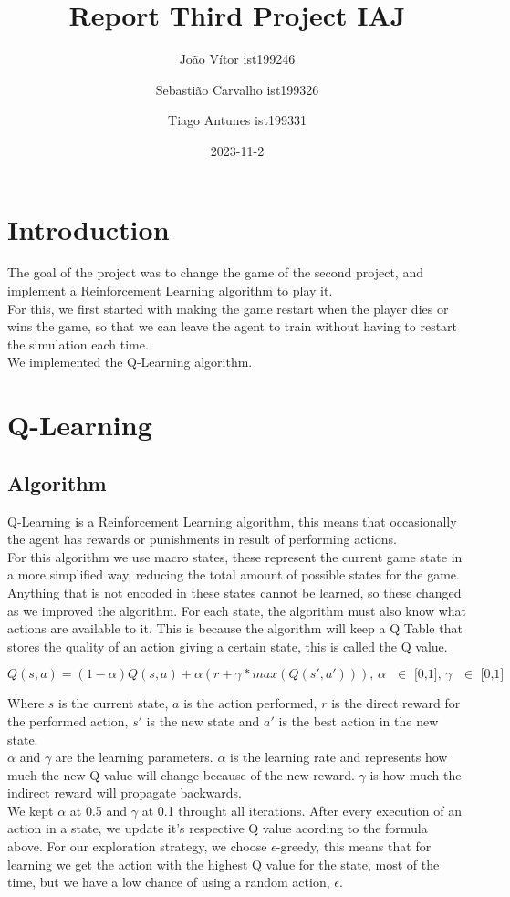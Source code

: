 \documentclass{article}
\title{Report Third Project IAJ}
\author{João Vítor ist199246
  \and Sebastião Carvalho ist199326
  \and Tiago Antunes ist199331}
\date{2023-11-2}
\begin{document}
  \maketitle
  \tableofcontents
  \newpage
  \section{Introduction}
  The goal of the project was to change the game of the second project, and implement a Reinforcement Learning algorithm to play it.\\
  For this, we first started with making the game restart when the player dies or wins the game, so that we can leave the agent to train
  without having to restart the simulation each time.\\
  We implemented the Q-Learning algorithm.\\
  \section{Q-Learning}
  \subsection{Algorithm}
  Q-Learning is a Reinforcement Learning algorithm, this means that occasionally the agent has rewards or punishments in result of
  performing actions.\\
  For this algorithm we use macro states, these represent the current game state in a more simplified way, reducing the total
  amount of possible states for the game. Anything that is not encoded in these states cannot be learned, so these changed as
  we improved the algorithm. For each state, the algorithm must also know what actions are available to it. This is because the
  algorithm will keep a Q Table that stores the quality of an action giving a certain state, this is called the Q value.

  \[Q(s,a) = (1-\alpha)Q(s, a) + \alpha(r + \gamma * max(Q(s', a'))) \text{, $\alpha$ $\in$ [0,1], $\gamma$ $\in$ [0,1]}\]

  \noindent
  Where $s$ is the current state, $a$ is the action performed, $r$ is the direct reward for the performed action,
  $s'$ is the new state and $a'$ is the best action in the new state.\\
  $\alpha$ and $\gamma$ are the learning parameters.
  $\alpha$ is the learning rate and represents how much the new Q value will change because of the new reward.
  $\gamma$ is how much the indirect reward will propagate backwards.\\
  We kept $\alpha$ at 0.5 and $\gamma$ at 0.1 throught all iterations.
  \noindent
  After every execution of an action in a state, we update it's respective Q value acording to the formula above. 
  For our exploration strategy, we choose $\epsilon$-greedy, this means that for learning we get the action with the highest Q value for
  the state, most of the time, but we have a low chance of using a random action, $\epsilon$.\\
  
\end{document}
